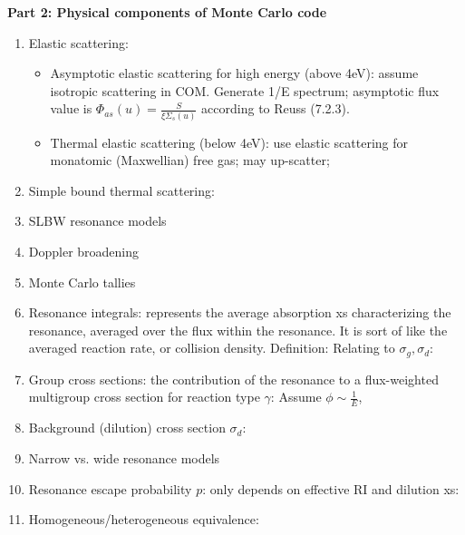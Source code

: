 \documentclass{school-22.211-notes}
\begin{document}
\textbf{Part 2: Physical components of Monte Carlo code}
\begin{enumerate}
\item Elastic scattering:
  \begin{itemize}
  \item Asymptotic elastic scattering for high energy (above 4eV): assume isotropic scattering in COM. Generate 1/E spectrum; asymptotic flux value is $\Phi_{as} (u) = \frac{S}{\xi \Sigma_s (u)}$ according to Reuss (7.2.3). 
  \item Thermal elastic scattering (below 4eV): use elastic scattering for monatomic (Maxwellian) free gas; may up-scatter;
  \end{itemize}
\item Simple bound thermal scattering: 
\item SLBW resonance models
\item Doppler broadening
\item Monte Carlo tallies
\item Resonance integrals: represents the average absorption xs characterizing the resonance, averaged over the flux within the resonance. It is sort of like the averaged reaction rate, or collision density. Definition:
Relating to $\sigma_g, \sigma_d$: 
\item Group cross sections: the contribution of the resonance to a flux-weighted multigroup cross section for reaction type $\gamma$:
  Assume $\phi \sim \frac{1}{E}$,
\item Background (dilution) cross section $\sigma_d$:
\item Narrow vs. wide resonance models
\item Resonance escape probability $p$: only depends on effective RI and dilution xs: 
\item Homogeneous/heterogeneous equivalence: 

\end{enumerate}
\end{document}
